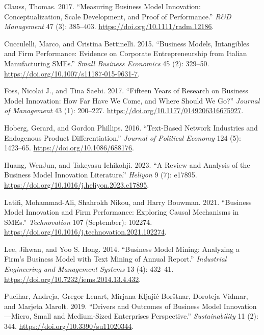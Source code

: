 \documentclass[
]{article}
\newlength{\cslhangindent}
\newenvironment{CSLReferences}[2] %
 {\begin{list}{}{%
  \setlength{\itemindent}{0pt}
  \setlength{\leftmargin}{0pt}
  \setlength{\parsep}{0pt}
  \ifodd #1
   \setlength{\leftmargin}{\cslhangindent}
   \setlength{\itemindent}{-1\cslhangindent}
  \fi
  \setlength{\itemsep}{#2\baselineskip}}}
 {\end{list}}
\begin{document}
\label{refs}
\begin{CSLReferences}{1}{0}
Clauss, Thomas. 2017. {``Measuring Business Model Innovation:
Conceptualization, Scale Development, and Proof of Performance.''}
\emph{R\&D Management} 47 (3): 385--403.
\url{https://doi.org/10.1111/radm.12186}.

Cucculelli, Marco, and Cristina Bettinelli. 2015. {``Business Models,
Intangibles and Firm Performance: Evidence on Corporate Entrepreneurship
from {Italian} Manufacturing {SMEs}.''} \emph{Small Business Economics}
45 (2): 329--50. \url{https://doi.org/10.1007/s11187-015-9631-7}.

Foss, Nicolai J., and Tina Saebi. 2017. {``Fifteen {Years} of {Research}
on {Business} {Model} {Innovation}: {How} {Far} {Have} {We} {Come}, and
{Where} {Should} {We} {Go}?''} \emph{Journal of Management} 43 (1):
200--227. \url{https://doi.org/10.1177/0149206316675927}.

Hoberg, Gerard, and Gordon Phillips. 2016. {``Text-{Based} {Network}
{Industries} and {Endogenous} {Product} {Differentiation}.''}
\emph{Journal of Political Economy} 124 (5): 1423--65.
\url{https://doi.org/10.1086/688176}.

Huang, WenJun, and Takeyasu Ichikohji. 2023. {``A Review and Analysis of
the Business Model Innovation Literature.''} \emph{Heliyon} 9 (7):
e17895. \url{https://doi.org/10.1016/j.heliyon.2023.e17895}.

Latifi, Mohammad-Ali, Shahrokh Nikou, and Harry Bouwman. 2021.
{``Business Model Innovation and Firm Performance: {Exploring} Causal
Mechanisms in {SMEs}.''} \emph{Technovation} 107 (September): 102274.
\url{https://doi.org/10.1016/j.technovation.2021.102274}.

Lee, Jihwan, and Yoo S. Hong. 2014. {``Business {Model} {Mining}:
{Analyzing} a {Firm}'s {Business} {Model} with {Text} {Mining} of
{Annual} {Report}.''} \emph{Industrial Engineering and Management
Systems} 13 (4): 432--41.
\url{https://doi.org/10.7232/iems.2014.13.4.432}.

Pucihar, Andreja, Gregor Lenart, Mirjana Kljajić Borštnar, Doroteja
Vidmar, and Marjeta Marolt. 2019. {``Drivers and {Outcomes} of
{Business} {Model} {Innovation}---{Micro}, {Small} and {Medium}-{Sized}
{Enterprises} {Perspective}.''} \emph{Sustainability} 11 (2): 344.
\url{https://doi.org/10.3390/su11020344}.


\end{CSLReferences}
\end{document}
